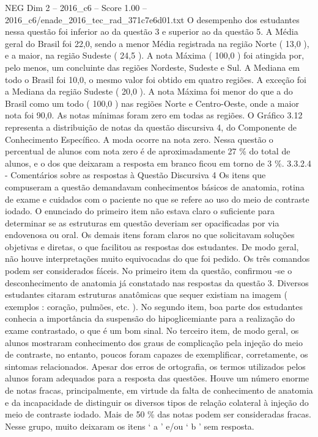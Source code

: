 \begin{textsample}{NEG Dim 2 – 2016\_c6 – Score 1.00 – 2016\_c6/enade\_2016\_tec\_rad\_371c7e6d01.txt}
O desempenho dos estudantes nessa questão foi inferior ao da questão 3 e superior ao da questão 5.
A Média geral do Brasil foi 22,0, sendo a menor Média registrada na região Norte ( 13,0 ), e a maior, na região Sudeste ( 24,5 ).
A nota Máxima ( 100,0 ) foi atingida por, pelo menos, um concluinte das regiões Nordeste, Sudeste e Sul.
A Mediana em todo o Brasil foi 10,0, o mesmo valor foi obtido em quatro regiões.
A exceção foi a Mediana da região Sudeste ( 20,0 ).
A nota Máxima foi menor do que a do Brasil como um todo ( 100,0 ) nas regiões Norte e Centro-Oeste, onde a maior nota foi 90,0.
As notas mínimas foram zero em todas as regiões.
O Gráfico 3.12 representa a distribuição de notas da questão discursiva 4, do Componente de Conhecimento Específico.
A moda ocorre na nota zero.
Nessa questão o percentual de alunos com nota zero é de aproximadamente 27 \% do total de alunos, e o dos que deixaram a resposta em branco ficou em torno de 3 \%. 3.3.2.4 - Comentários sobre as respostas à Questão Discursiva 4 Os itens que compuseram a questão demandavam conhecimentos básicos de anatomia, rotina de exame e cuidados com o paciente no que se refere ao uso do meio de contraste iodado.
O enunciado do primeiro item não estava claro o suficiente para determinar se as estruturas em questão deveriam ser opacificadas por via endovenosa ou oral.
Os demais itens foram claros no que solicitavam soluções objetivas e diretas, o que facilitou as respostas dos estudantes.
De modo geral, não houve interpretações muito equivocadas do que foi pedido.
Os três comandos podem ser considerados fáceis.
No primeiro item da questão, confirmou -se o desconhecimento de anatomia já constatado nas respostas da questão 3.
Diversos estudantes citaram estruturas anatômicas que sequer existiam na imagem ( exemplos : coração, pulmões, etc. ).
No segundo item, boa parte dos estudantes conhecia a importância da suspensão do hipoglicemiante para a realização do exame contrastado, o que é um bom sinal.
No terceiro item, de modo geral, os alunos mostraram conhecimento dos graus de complicação pela injeção do meio de contraste, no entanto, poucos foram capazes de exemplificar, corretamente, os sintomas relacionados.
Apesar dos erros de ortografia, os termos utilizados pelos alunos foram adequados para a resposta das questões.
Houve um número enorme de notas fracas, principalmente, em virtude da falta de conhecimento de anatomia e da incapacidade de distinguir os diversos tipos de relação colateral à injeção do meio de contraste iodado.
Mais de 50 \% das notas podem ser consideradas fracas.
Nesse grupo, muito deixaram os itens ‘ a ’ e/ou ‘ b ’ sem resposta.

\end{textsample}

